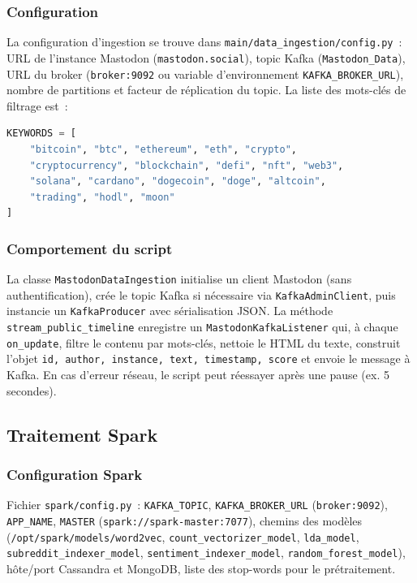 \documentclass[12pt,a4paper]{article}
\begin{document}
\subsubsection{Configuration}

La configuration d'ingestion se trouve dans \texttt{main/data\_ingestion/config.py}~: URL de l'instance Mastodon (\texttt{mastodon.social}), topic Kafka (\texttt{Mastodon\_Data}), URL du broker (\texttt{broker:9092} ou variable d'environnement \texttt{KAFKA\_BROKER\_URL}), nombre de partitions et facteur de réplication du topic. La liste des mots-clés de filtrage est~:

\begin{lstlisting}[language=Python,caption=Mots-clés de filtrage (config.py)]
KEYWORDS = [
    "bitcoin", "btc", "ethereum", "eth", "crypto",
    "cryptocurrency", "blockchain", "defi", "nft", "web3",
    "solana", "cardano", "dogecoin", "doge", "altcoin",
    "trading", "hodl", "moon"
]
\end{lstlisting}

\subsubsection{Comportement du script}

La classe \texttt{MastodonDataIngestion} initialise un client Mastodon (sans authentification), crée le topic Kafka si nécessaire via \texttt{KafkaAdminClient}, puis instancie un \texttt{KafkaProducer} avec sérialisation JSON. La méthode \texttt{stream\_public\_timeline} enregistre un \texttt{MastodonKafkaListener} qui, à chaque \texttt{on\_update}, filtre le contenu par mots-clés, nettoie le HTML du texte, construit l'objet \texttt{id, author, instance, text, timestamp, score} et envoie le message à Kafka. En cas d'erreur réseau, le script peut réessayer après une pause (ex. 5 secondes).

\subsection{Traitement Spark}

\subsubsection{Configuration Spark}

Fichier \texttt{spark/config.py}~: \texttt{KAFKA\_TOPIC}, \texttt{KAFKA\_BROKER\_URL} (\texttt{broker:9092}), \texttt{APP\_NAME}, \texttt{MASTER} (\texttt{spark://spark-master:7077}), chemins des modèles (\texttt{/opt/spark/models/word2vec}, \texttt{count\_vectorizer\_model}, \texttt{lda\_model}, \texttt{subreddit\_indexer\_model}, \texttt{sentiment\_indexer\_model}, \texttt{random\_forest\_model}), hôte/port Cassandra et MongoDB, liste des stop-words pour le prétraitement.
\end{document}

